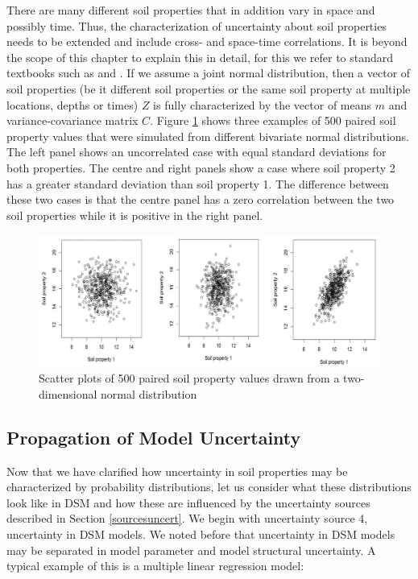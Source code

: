 \documentclass[10pt,b5paper,]{book}
\theoremstyle{definition}
\theoremstyle{definition}
\theoremstyle{definition}
\theoremstyle{remark}
\begin{document}
There are many different soil properties that in addition vary in space
and possibly time. Thus, the characterization of uncertainty about soil
properties needs to be extended and include cross- and space-time
correlations. It is beyond the scope of this chapter to explain this in
detail, for this we refer to standard textbooks such as
\cite{goovaerts1997geostatistics} and \cite{webster_2007}. If we assume
a joint normal distribution, then a vector of soil properties (be it
different soil properties or the same soil property at multiple
locations, depths or times) \(Z\) is fully characterized by the vector
of means \(m\) and variance-covariance matrix \(C\). Figure
\ref{fig:pairedsoils} shows three examples of 500 paired soil property
values that were simulated from different bivariate normal
distributions. The left panel shows an uncorrelated case with equal
standard deviations for both properties. The centre and right panels
show a case where soil property 2 has a greater standard deviation than
soil property 1. The difference between these two cases is that the
centre panel has a zero correlation between the two soil properties
while it is positive in the right panel.

\begin{figure}

{\centering \includegraphics[width=0.8\linewidth]{images/pairedsoilpropierties} 

}

\caption{Scatter plots of 500 paired soil property values drawn from a two-dimensional normal distribution}\label{fig:pairedsoils}
\end{figure}

\hypertarget{propagation-of-model-uncertainty}{%
\subsection{Propagation of Model
Uncertainty}\label{propagation-of-model-uncertainty}}

Now that we have clarified how uncertainty in soil properties may be
characterized by probability distributions, let us consider what these
distributions look like in DSM and how these are influenced by the
uncertainty sources described in Section \ref{sourcesuncert}. We begin
with uncertainty source 4, uncertainty in DSM models. We noted before
that uncertainty in DSM models may be separated in model parameter and
model structural uncertainty. A typical example of this is a multiple
linear regression model:
\end{document}
